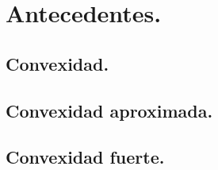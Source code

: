 \section{Antecedentes.}
\subsection{Convexidad.}
\subsection{Convexidad aproximada.}
\subsection{Convexidad fuerte.}
